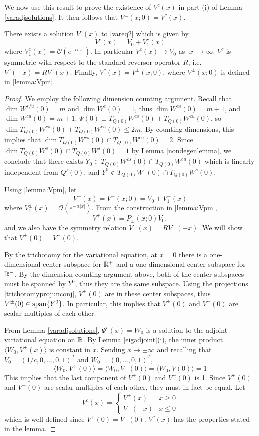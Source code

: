 \documentclass[thesis.tex]{subfiles}
\begin{document}
We now use this result to prove the existence of $V^c(x)$ in part (i) of Lemma \ref{varadjsolutions}. It then follows that $V^\pm(x; 0) = V^c(x)$.

\begin{lemma}\label{lemma:Vcexists}
There exists a solution $V^c(x)$ to \eqref{vareq2} which is given by
\[
V^c(x) = V_0 + V^c_1(x)
\]
where $V^c_1(x) = \mathcal{O}(e^{-\alpha |x|})$. In particular $V^c(x) \rightarrow V_0$ as $|x| \rightarrow \infty$. $V^c$ is symmetric with respect to the standard reversor operator $R$, i.e. $V^c(-x) = R V^c(x)$. Finally, $V^c(x) = V^\pm(x; 0)$, where $V^\pm(x; 0)$ is defined in \cref{lemma:Vpm}. 

\begin{proof}
We employ the following dimension counting argument. Recall that $\dim W^{s/u}(0) = m$ and $\dim W^c(0) = 1$, thus $\dim W^{cs}(0) = m + 1$, and $\dim W^{cu}(0) = m + 1$. $\Psi(0) \perp T_{Q(0)}W^{cs}(0) + T_{Q(0)}W^{cu}(0)$, so $\dim T_{Q(0)}W^{cs}(0) + T_{Q(0)}W^{cu}(0) \leq 2m$. By counting dimensions, this implies that $\dim T_{Q(0)}W^{cs}(0) \cap T_{Q(0)}W^{cu}(0) = 2$. Since $\dim T_{Q(0)}W^s(0) \cap T_{Q(0)}W^s(0) = 1$ by Lemma \ref{nondegenlemma}, we conclude that there exists $Y_0 \in T_{Q(0)}W^{cs}(0) \cap T_{Q(0)}W^{cu}(0)$ which is linearly independent from $Q'(0)$, and $Y^0 \notin T_{Q(0)}W^s(0) \cap T_{Q(0)}W^s(0)$.

Using \cref{lemma:Vpm}, let
\[
V^\pm(x) = V^\pm(x; 0) = V_0 + V_1^\pm(x)
\]
where $V_1^\pm(x) = \mathcal{O}(e^{-\alpha |x|})$. From the construction in \cref{lemma:Vpm},
\[
V^\pm(x) = P_\pm(x; 0) V_0,
\]
and we also have the symmetry relation $V^-(x) = R V^+(-x)$. We will show that $V^+(0) = V^-(0)$.

By the trichotomy for the variational equation, at $x = 0$ there is a one-dimensional center subspace for $\mathbb{R}^+$ and a one-dimensional center subspace for $\mathbb{R}^-$. By the dimension counting argument above, both of the center subspaces must be spanned by $Y^0$, thus they are the same subspace. Using the projections \eqref{trichotomyprojunconj}, $V^\pm(0)$ are in these center subspaces, thus $V^\pm(0) \in \mathop\mathrm{span}\nolimits \{Y^0 \}$. In particular, this implies that $V^+(0)$ and $V^-(0)$ are scalar multiples of each other. 

From Lemma \ref{varadjsolutions}, $\Psi^c(x) = W_0$ is a solution to the adjoint variational equation on $\mathbb{R}$. By Lemma \ref{eigadjoint}(i), the inner product $\langle W_0, V^\pm(x) \rangle$ is constant in $x$. Sending $x \rightarrow \pm \infty$ and recalling that $V_0 = (1/c, 0, \dots, 0, 1)^T $ and $W_0 = (0, \dots, 0, 1)^T$,
\[
\langle W_0, V^+(0) \rangle = \langle W_0, V^-(0) \rangle
= \langle W_0, V(0) \rangle = 1
\]
This implies that the last component of $V^+(0)$ and $V^-(0)$ is 1. Since $V^+(0)$ and $V^-(0)$ are scalar multiples of each other, they must in fact be equal. Let
\[
V^c(x) = \begin{cases}
V^+(x) & x \geq 0 \\
V^-(-x) & x \leq 0 
\end{cases}
\]
which is well-defined since $V^+(0) = V^-(0)$. $V^c(x)$ has the properties stated in the lemma.
\end{proof}
\end{lemma}
\end{document}
